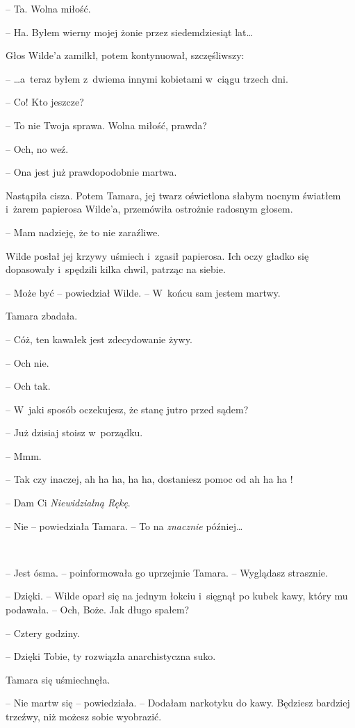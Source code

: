 \documentclass[oneside,polish,11pt,sfheadings]{mwbk}
\begin{document}
-- Ta. Wolna miłość.

-- Ha. Byłem wierny mojej żonie przez siedemdziesiąt lat\ldots

Głos Wilde'a zamilkł, potem kontynuował, szczęśliwszy: 

-- \ldots a~teraz byłem z~dwiema innymi kobietami w~ciągu trzech dni.

-- Co! Kto jeszcze?

-- To nie Twoja sprawa. Wolna miłość, prawda?

-- Och, no weź.

-- Ona jest już prawdopodobnie martwa.

Nastąpiła cisza. Potem Tamara, jej twarz oświetlona słabym nocnym
światłem i~żarem papierosa Wilde'a, przemówiła ostrożnie radosnym
głosem.

-- Mam nadzieję, że to nie zaraźliwe.

Wilde posłał jej krzywy uśmiech i~zgasił papierosa. Ich oczy gładko się
dopasowały i~spędzili kilka chwil, patrząc na siebie.

-- Może być -- powiedział Wilde. -- W~końcu sam jestem martwy.

Tamara zbadała.

-- Cóż, ten kawałek jest zdecydowanie żywy.

-- Och nie.

-- Och tak.

-- W~jaki sposób oczekujesz, że stanę jutro przed sądem?

-- Już dzisiaj stoisz w~porządku.

-- Mmm.

-- Tak czy inaczej, ah ha ha, ha ha, dostaniesz pomoc od ah ha ha !

-- Dam Ci \emph{Niewidzialną Rękę}.

-- Nie -- powiedziała Tamara. -- To na \emph{znacznie} później\ldots

~

-- Jest ósma. -- poinformowała go uprzejmie Tamara. -- Wyglądasz strasznie.

-- Dzięki. -- Wilde oparł się na jednym łokciu i~sięgnął po kubek kawy,
który mu podawała. -- Och, Boże. Jak długo spałem?

-- Cztery godziny.

-- Dzięki Tobie, ty rozwiązła anarchistyczna suko.

Tamara się uśmiechnęła.

-- Nie martw się -- powiedziała. -- Dodałam narkotyku do kawy. Będziesz
bardziej trzeźwy, niż możesz sobie wyobrazić.
\end{document}
